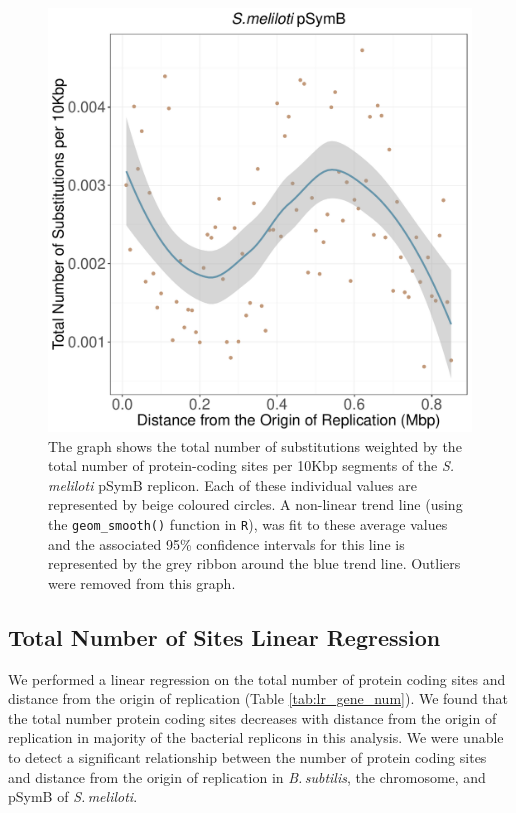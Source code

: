 \documentclass[11pt]{article}
\newcommand{\smel}{\textit{S.\,meliloti}\xspace}
\newcommand{\bass}{\textit{B.\,subtilis}\xspace}
\newcommand{\pb}{pSymB\xspace}
\begin{document}
\begin{figure}[h]
	\begin{center}
		\includegraphics[width=\textwidth]{./figs/pSymB_10KB_weighted_subs_nonpar_22Sep20.pdf}
		\caption{\label{fig:pSymB_nonpar}The graph shows the total number of substitutions weighted by the total number of protein-coding sites per 10Kbp segments of the \smel \pb replicon. Each of these individual values are represented by beige coloured circles. A non-linear trend line (using the \texttt{geom\_smooth()} function in \texttt{R}), was fit to these average values and the associated 95\% confidence intervals for this line is represented by the grey ribbon around the blue trend line. Outliers were removed from this graph.}
	\end{center}
\end{figure}

\subsection{Total Number of Sites Linear Regression}

We performed a linear regression on the total number of protein coding sites and distance from the origin of replication (Table \ref{tab:lr_gene_num}).
We found that the total number protein coding sites decreases with distance from the origin of replication in majority of the bacterial replicons in this analysis.
We were unable to detect a significant relationship between the number of protein coding sites and distance from the origin of replication in \bass,  the chromosome, and \pb of \smel.
\end{document}
